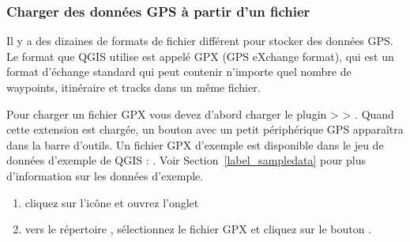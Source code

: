 \subsubsection{Charger des données GPS à partir d'un
fichier}\label{label_loadgps}

Il y a des dizaines de formats de fichier différent pour stocker des données
GPS.
Le format que QGIS utilise est appelé GPX (GPS eXchange format), qui est un
format d'échange standard qui peut contenir n'importe quel nombre de waypoints,
itinéraire et tracks dans un même fichier.

Pour charger un fichier GPX vous devez d'abord charger le plugin
 >  > . Quand cette extension est chargée, un bouton avec
un petit périphérique GPS apparaîtra dans la barre d'outils. Un fichier GPX
d'exemple est disponible dans le jeu de données d'exemple de QGIS :
. Voir 
Section~\ref{label_sampledata} pour plus d'information sur les données
d'exemple.

\begin{enumerate}
\item cliquez sur l'icône  et ouvrez 
l'onglet 
\item {} vers le répertoire ,
sélectionnez le fichier GPX  et cliquez sur le
bouton .
\end{enumerate}

